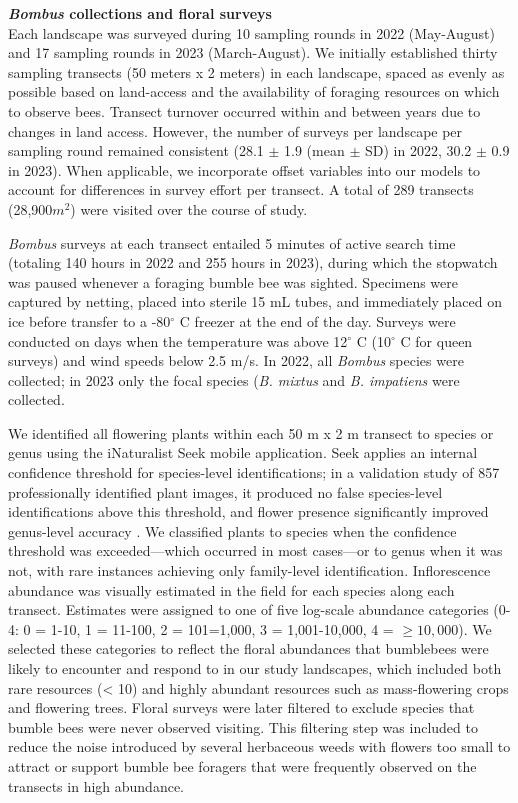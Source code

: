 \documentclass[11pt]{article}
\begin{document}
\noindent \textbf{\textit{Bombus} collections and floral surveys} \\
Each landscape was surveyed during 10 sampling rounds in 2022 (May-August) and 17 sampling rounds in 2023 (March-August). We initially established thirty sampling transects (50 meters x 2 meters) in each landscape, spaced as evenly as possible based on land-access and the availability of foraging resources on which to observe bees. Transect turnover occurred within and between years due to changes in land access. However, the number of surveys per landscape per sampling round remained consistent (28.1 $\pm$ 1.9 (mean $\pm$ SD) in 2022, 30.2 $\pm$ 0.9 in 2023). When applicable, we incorporate offset variables into our models to account for differences in survey effort per transect. A total of 289 transects (28,900$m^2$) were visited over the course of study.

\textit{Bombus} surveys at each transect entailed 5 minutes of active search time (totaling 140 hours in 2022 and 255 hours in 2023), during which the stopwatch was paused whenever a foraging bumble bee was sighted. Specimens were captured by netting, placed into sterile 15 mL tubes, and immediately placed on ice before transfer to a -80$^\circ$ C freezer at the end of the day.  Surveys were conducted on days when the temperature was above 12$^\circ$  C (10$^\circ$  C for queen surveys) and wind speeds below 2.5 m/s. In 2022, all \textit{Bombus} species were collected; in 2023 only the focal species (\textit{B. mixtus} and \textit{B. impatiens} were collected.

We identified all flowering plants within each 50 m x 2 m transect to species or genus using the iNaturalist Seek mobile application. Seek applies an internal confidence threshold for species-level identifications; in a validation study of 857 professionally identified plant images, it produced no false species-level identifications above this threshold, and flower presence significantly improved genus-level accuracy \parencite{hart_assessing_2023}. We classified plants to species when the confidence threshold was exceeded---which occurred in most cases---or to genus when it was not, with rare instances achieving only family-level identification. Inflorescence abundance was visually estimated in the field for each species along each transect. Estimates were assigned to one of five log-scale abundance categories (0-4: 0 = 1-10, 1 = 11-100, 2 = 101=1,000, 3 = 1,001-10,000, 4 = $\geq 10,000$). We selected these categories to reflect the floral abundances that bumblebees were likely to encounter and respond to in our study landscapes, which included both rare resources (< 10) and highly abundant resources such as mass-flowering crops and flowering trees. Floral surveys were later filtered to exclude species that bumble bees were never observed visiting. This filtering step was included to reduce the noise introduced by several herbaceous weeds with flowers too small to attract or support bumble bee foragers that were frequently observed on the transects in high abundance. \\
\end{document}
